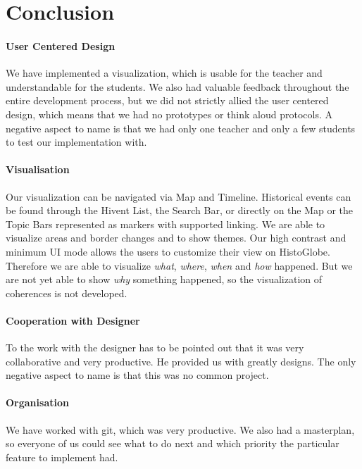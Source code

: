 \section{Conclusion} %
\label{sec:conclusion}

\paragraph{User Centered Design} %
We have implemented a visualization, which is usable for the teacher and understandable for the students. We also had valuable feedback throughout the entire development process, but we did not strictly allied the user centered design, which means that we had no prototypes or think aloud protocols. A negative aspect to name is that we had only one teacher and only a few students to test our implementation with.

\paragraph{Visualisation} %
Our visualization can be navigated via Map and Timeline. Historical events can be found through the Hivent List, the Search Bar, or directly on the Map or the Topic Bars represented as markers with supported linking. We are able to visualize areas and border changes and to show themes. Our high contrast and minimum UI mode allows the users to customize their view on HistoGlobe. Therefore we are able to visualize \textit{what}, \textit{where}, \textit{when} and \textit{how} happened. But we are not yet able to show \textit{why} something happened, so the visualization of coherences is not developed.

\paragraph{Cooperation with Designer} %
To the work with the designer has to be pointed out that it was very collaborative and very productive. He provided us with greatly designs. The only negative aspect to name is that this was no common project. %

\paragraph{Organisation} %
We have worked with git, which was very productive. We also had a masterplan, so everyone of us could see what to do next and which priority the particular feature to implement had.

